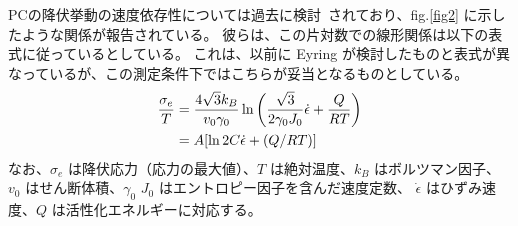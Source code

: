 \documentclass[uplatex,dvipdfmx,a4paper,10pt]{jsarticle}
\begin{document}
PCの降伏挙動の速度依存性については過去に検討~\cite{bauwens}されており、fig.\ref{fig2} に示したような関係が報告されている。
彼らは、この片対数での線形関係は以下の表式に従っているとしている。
これは、以前に Eyring が検討したものと表式が異なっているが、この測定条件下ではこちらが妥当となるものとしている。
\begin{align}
	\dfrac{\sigma_e}{T} &= \dfrac{4\sqrt{3}k_B}{v_0 \gamma_0} \ln \left(\dfrac{\sqrt{3}}{2 \gamma_0 J_0} \dot{\epsilon} + \dfrac{Q}{RT} \right) \notag \\
	 &= A [ \ln 2 C \dot{\epsilon} + (Q/RT)]
	 \label{eq1}
\end{align}
なお、$\sigma_e$ は降伏応力（応力の最大値）、$T$ は絶対温度、$k_B$ はボルツマン因子、$v_0$ はせん断体積、$\gamma_0$ $J_0$ はエントロピー因子を含んだ速度定数、 $\dot{\epsilon}$ はひずみ速度、$Q$ は活性化エネルギーに対応する。

\newpage
\end{document}
